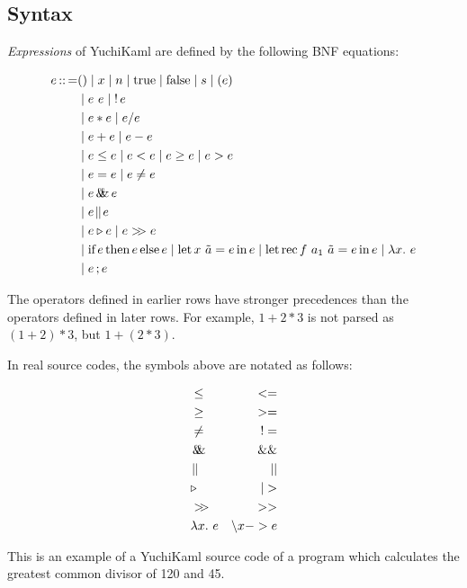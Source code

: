 
\subsection{Syntax}

\emph{Expressions} of YuchiKaml are defined by the following BNF equations:

\begin{align*}
    e \defeq    & () \mid x \mid n \mid \trueToken \mid \falseToken \mid s \mid (e)\\
                &\mid e\ e \mid \logNot e\\
                &\mid e * e \mid e / e\\
                &\mid e + e \mid e - e\\
                &\mid e \leq e \mid e < e \mid e \geq e \mid e > e\\
                &\mid e = e \mid e \not= e\\
                &\mid e \logAnd e\\
                &\mid e \logOr e\\
                &\mid e \triangleright e \mid e \composition e\\
                &\mid \ifStructure{e}{e}{e} \mid \letStructure{x\ \tilde{a}}{e}{e} \mid \letRecStructure{f}{a_1\ \tilde{a}}{e}{e} \mid \abs{x}{e}\\
                &\mid e\opCol{}e
\end{align*}

The operators defined in earlier rows have stronger precedences than the operators defined in later rows.
For example, $1 + 2 * 3$ is not parsed as $(1 + 2) * 3$, but $1 + ( 2 * 3)$.

In real source codes, the symbols above are notated as follows:

\begin{align*}
    &\leq & <=\\
    &\geq & >=\\
    &\not= & !=\\
    &\logAnd & \&\&\\
    &\logOr & ||\\
    &\triangleright & |>\\
    &\composition & >>\\
    &\abs{x}{e} & \backslash x -> e
\end{align*}


\begin{example}[GCD]
    This is an example of a YuchiKaml source code of a program which calculates the greatest common divisor of 120 and 45.

    
\end{example}

